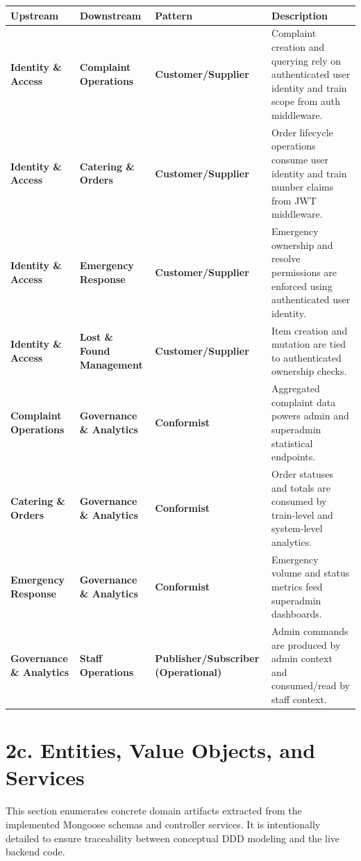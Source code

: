 \documentclass[12pt,a4paper]{report}
\begin{document}
\begin{table}[H]
\centering
\begin{tabularx}{\textwidth}{>{\bfseries}p{} >{\bfseries}p{} >{\bfseries}p{} Y}
\toprule
{}
\textcolor{TableHeaderText}{Upstream} & \textcolor{TableHeaderText}{Downstream} & \textcolor{TableHeaderText}{Pattern} & \textcolor{TableHeaderText}{Description} \\
\midrule
Identity \& Access & Complaint Operations & Customer/Supplier & Complaint creation and querying rely on authenticated user identity and train scope from auth middleware. \\
Identity \& Access & Catering \& Orders & Customer/Supplier & Order lifecycle operations consume user identity and train number claims from JWT middleware. \\
Identity \& Access & Emergency Response & Customer/Supplier & Emergency ownership and resolve permissions are enforced using authenticated user identity. \\
Identity \& Access & Lost \& Found Management & Customer/Supplier & Item creation and mutation are tied to authenticated ownership checks. \\
Complaint Operations & Governance \& Analytics & Conformist & Aggregated complaint data powers admin and superadmin statistical endpoints. \\
Catering \& Orders & Governance \& Analytics & Conformist & Order statuses and totals are consumed by train-level and system-level analytics. \\
Emergency Response & Governance \& Analytics & Conformist & Emergency volume and status metrics feed superadmin dashboards. \\
Governance \& Analytics & Staff Operations & Publisher/Subscriber (Operational) & Admin commands are produced by admin context and consumed/read by staff context. \\
\bottomrule
\end{tabularx}
\end{table}

\section{2c. Entities, Value Objects, and Services}

This section enumerates concrete domain artifacts extracted from the implemented Mongoose schemas and controller services. It is intentionally detailed to ensure traceability between conceptual DDD modeling and the live backend code.
\end{document}
